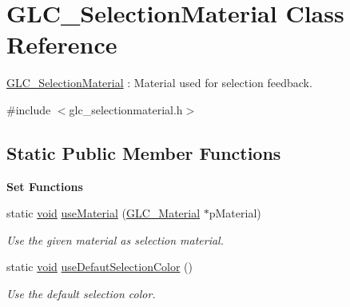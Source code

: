 \hypertarget{class_g_l_c___selection_material}{\section{G\-L\-C\-\_\-\-Selection\-Material Class Reference}
\label{class_g_l_c___selection_material}
}


\hyperlink{class_g_l_c___selection_material}{G\-L\-C\-\_\-\-Selection\-Material} \-: Material used for selection feedback.  




{\ttfamily \#include $<$glc\-\_\-selectionmaterial.\-h$>$}

\subsection*{Static Public Member Functions}
\begin{Indent}{\bf Set Functions}\par
\begin{DoxyCompactItemize}
\item 
static \hyperlink{group___u_a_v_objects_plugin_ga444cf2ff3f0ecbe028adce838d373f5c}{void} \hyperlink{class_g_l_c___selection_material_a72facd9a0c3db2d59a2724172bdd4c37}{use\-Material} (\hyperlink{class_g_l_c___material}{G\-L\-C\-\_\-\-Material} $\ast$p\-Material)
\begin{DoxyCompactList}\small\item\em Use the given material as selection material. \end{DoxyCompactList}\item 
static \hyperlink{group___u_a_v_objects_plugin_ga444cf2ff3f0ecbe028adce838d373f5c}{void} \hyperlink{class_g_l_c___selection_material_aafe33900c73733a35524c57b10b83989}{use\-Defaut\-Selection\-Color} ()
\begin{DoxyCompactList}\small\item\em Use the default selection color. \end{DoxyCompactList}\end{DoxyCompactItemize}
\end{Indent}
